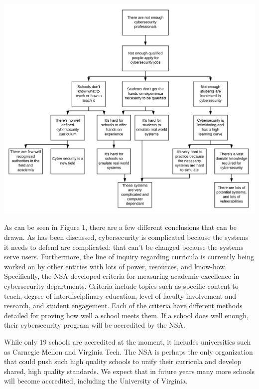 \documentclass[openright]{report}
\begin{document}
\begin{center}
    \includegraphics[scale=0.34]{images/Why-Why.png}
\end{center}

\par As can be seen in Figure 1, there are a few different conclusions that can be drawn. As has been discussed, cybersecurity is complicated because the systems it needs to defend are complicated: that can't be changed because the systems serve users. Furthermore, the line of inquiry regarding curricula is currently being worked on by other entities with lots of power, resources, and know-how. Specifically, the NSA developed criteria for measuring academic excellence in cybersecurity departments. Criteria include topics such as specific content to teach, degree of interdisciplinary education, level of faculty involvement and research, and student engagement. Each of the criteria have different methods detailed for proving how well a school meets them. If a school does well enough, their cybersecurity program will be accredited by the NSA\cite{nsa_accred}. 

\par While only 19 schools are accredited at the moment, it includes universities such as Carnegie Mellon and Virginia Tech\cite{nsa_accred_schools}. The NSA is perhaps the only organization that could push such high quality schools to unify their curricula and develop shared, high quality standards. We expect that in future years many more schools will become accredited, including the University of Virginia. 
\end{document}
